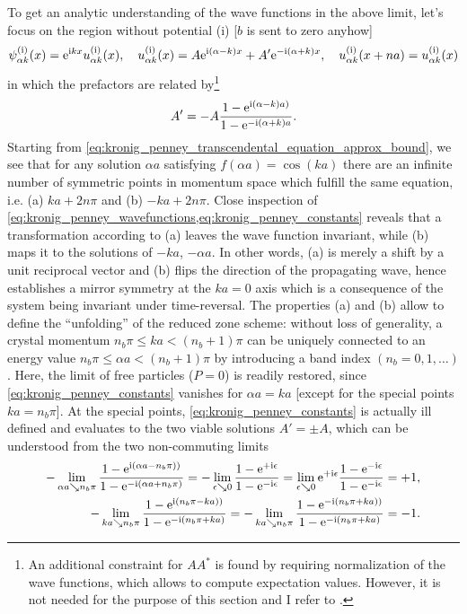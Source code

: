 To get an analytic understanding of the wave functions in the above limit, let's focus on the region without potential (i) [$b$ is sent to zero anyhow]
\begin{align}
    \psi_{\alpha k}^{\rm (i)}(x) = \mathrm e^{\mathrm i kx}u_{\alpha k}^{\rm (i)}(x),
    \quad
    u_{\alpha k}^{\rm (i)}(x) = A\mathrm e^{\mathrm i(\alpha-k) x} + A'\mathrm e^{-\mathrm i(\alpha+k) x},
    \quad
    u_{\alpha k}^{\rm (i)}(x+na)=u_{\alpha k}^{\rm (i)}(x)
    \label{eq:kronig_penney_wavefunctions}
\end{align}
in which the prefactors are related by\footnote{An additional constraint for $AA^*$ is found by requiring normalization of the wave functions, which allows to compute expectation values. However, it is not needed for the purpose of this section and I refer to \cite{KronigPenney1931}.}
\begin{align}
    A' = -A\frac{1-\mathrm e^{\mathrm i(\alpha-k)a)}}{1-\mathrm e^{-\mathrm i(\alpha+k)a}}.
    \label{eq:kronig_penney_constants}
\end{align}
Starting from \cref{eq:kronig_penney_transcendental_equation_approx_bound}, we see that for any solution $\alpha a$ satisfying $f(\alpha a)=\cos(k a)$ there are an infinite number of symmetric points in momentum space which fulfill the same equation, i.e. (a) $ka + 2n\pi$ and (b) $-ka+2n\pi$.
Close inspection of \cref{eq:kronig_penney_wavefunctions,eq:kronig_penney_constants} reveals that a transformation according to (a) leaves the wave function invariant, while (b) maps it to the solutions of $-ka$, $-\alpha a$.
In other words, (a) is merely a shift by a unit reciprocal vector and (b) flips the direction of the propagating wave, hence establishes a mirror symmetry at the $ka=0$ axis which is a consequence of the system being invariant under time-reversal.
The properties (a) and (b) allow to define the ``unfolding'' of the reduced zone scheme:
without loss of generality, a crystal momentum $n_b\pi\leq ka<(n_b+1)\pi$ can be uniquely connected to an energy value $n_b\pi\leq \alpha a<(n_b+1)\pi$ by introducing a band index $(n_b=0,1,\dots)$.
Here, the limit of free particles ($P=0$) is readily restored, since \cref{eq:kronig_penney_constants} vanishes for $\alpha a = ka$ [except for the special points $ka=n_b\pi$].
At the special points, \cref{eq:kronig_penney_constants} is actually ill defined and evaluates to the two viable solutions $A'=\pm A$, which can be understood from the two non-commuting limits
\begin{align}
    -\lim_{\alpha a \searrow n_b\pi}\frac{1-\mathrm e^{\mathrm i(\alpha a-n_b\pi))}}{1-\mathrm e^{-\mathrm i(\alpha a+n_b\pi)}}
    =
    -\lim_{\epsilon\searrow0}\frac{1-\mathrm e^{+\mathrm i\epsilon}}{1-\mathrm e^{-\mathrm i\epsilon}}
    =
    \lim_{\epsilon\searrow0}\mathrm e^{+\mathrm i\epsilon}\frac{1-\mathrm e^{-\mathrm i\epsilon}}{1-\mathrm e^{-\mathrm i\epsilon}}
    =
    +1,
    \\
    -\lim_{k a \searrow n_b\pi}\frac{1-\mathrm e^{\mathrm i(n_b\pi - ka))}}{1-\mathrm e^{-\mathrm i(n_b\pi+ka)}}
    =
    -\lim_{k a \searrow n_b\pi}\frac{1-\mathrm e^{-\mathrm i(n_b\pi + ka))}}{1-\mathrm e^{-\mathrm i(n_b\pi+ka)}}
    =
    -1.
\end{align}
